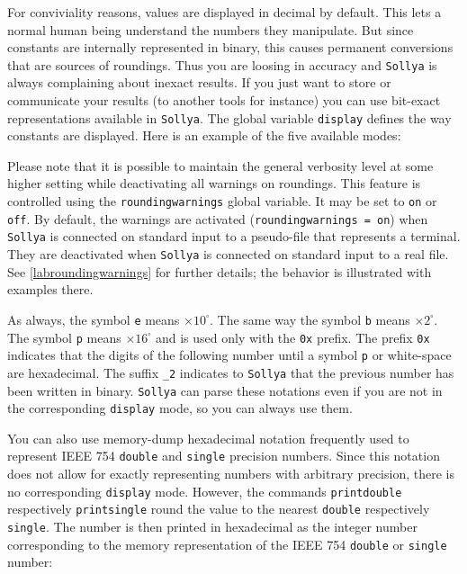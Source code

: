 \documentclass[a4paper]{article}
\newcommand{\com}[1]{\texttt{#1}}
\newcommand{\key}[1]{\texttt{#1}}
\newcommand{\sollya}{\texttt{Sollya}\xspace}
\begin{document}


For conviviality reasons, values are displayed in decimal by default. This lets a normal human being understand the numbers they manipulate. But since constants are internally represented in binary, this causes permanent conversions that are sources of roundings. Thus you are loosing in accuracy and \sollya is always complaining about inexact results. If you just want to store or communicate your results (to another tools for instance) you can use bit-exact representations available in \sollya. The global variable \key{display} defines the way constants are displayed. Here is an example of the five available modes:



Please note that it is possible to maintain the general verbosity level at
some higher setting while deactivating all warnings on roundings. This
feature is controlled using the \key{roundingwarnings} global
variable. It may be set to \key{on} or \key{off}. By default, the
warnings are activated (\key{roundingwarnings = on}) when \sollya is
connected on standard input to a pseudo-file that represents a
terminal. They are deactivated when \sollya is connected on standard
input to a real file. See \ref{labroundingwarnings} for further details; the behavior is
illustrated with examples there.

As always, the symbol \texttt{e} means $\times 10^\square $. The same way the symbol \texttt{b} means  $\times 2^\square $. The symbol \texttt{p} means $\times 16^\square$ and is used only with the \texttt{0x} prefix. The prefix \texttt{0x} indicates that the digits of the following number until 
a symbol \texttt{p} or white-space are hexadecimal. The suffix \texttt{\_2} indicates to \sollya that the previous number has been written in binary. \sollya can parse these notations even if you are not in the corresponding \key{display} mode, so you can always use them.

You can also use memory-dump hexadecimal notation frequently used to represent IEEE 754 \texttt{double} and \texttt{single} precision numbers. Since this notation does not allow for exactly representing numbers with arbitrary precision, there is no corresponding \key{display} mode. However, the commands \com{printdouble} respectively \com{printsingle} round the value to the nearest \texttt{double} respectively \texttt{single}. The number is then printed in hexadecimal as the integer number corresponding to the memory representation of the IEEE 754 \texttt{double} or \texttt{single} number:
\end{document}
